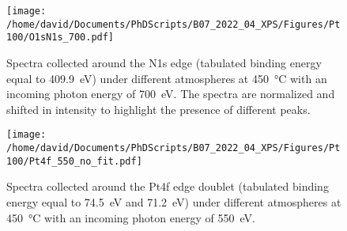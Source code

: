\begin{figure}[!htb]
    \centering
    \texttt{[image: /home/david/Documents/PhDScripts/B07\_2022\_04\_XPS/Figures/Pt100/O1sN1s\_700.pdf]}
    \caption{
        Spectra collected around the N1s edge (tabulated binding energy equal to \qty{409.9}{\eV}) under different atmospheres at \qty{450}{\degreeCelsius} with an incoming photon energy of \qty{700}{\eV}.
        The spectra are normalized and shifted in intensity to highlight the presence of different peaks.
    }
    \label{fig:O1sN1sPt100}
\end{figure}

\begin{figure}[!htb]
    \centering
    \texttt{[image: /home/david/Documents/PhDScripts/B07\_2022\_04\_XPS/Figures/Pt100/Pt4f\_550\_no\_fit.pdf]}
    \caption{
    	Spectra collected around the Pt4f edge doublet (tabulated binding energy equal to \qty{74.5}{\eV} and \qty{71.2}{\eV}) under different atmospheres at \qty{450}{\degreeCelsius} with an incoming photon energy of \qty{550}{\eV}.
    }
    \label{fig:Pt4fPt100}
\end{figure}


